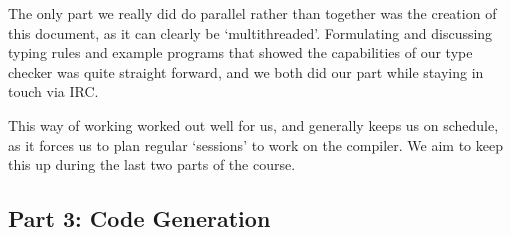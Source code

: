 \documentclass[a4paper]{article}
\begin{document}
The only part we really did do parallel rather than together was the creation of this document, as it can clearly be `multithreaded'. Formulating and discussing typing rules and example programs that showed the capabilities of our type checker was quite straight forward, and we both did our part while staying in touch via IRC.

This way of working worked out well for us, and generally keeps us on schedule, as it forces us to plan regular `sessions' to work on the compiler. We aim to keep this up during the last two parts of the course.

\subsection{Part 3: Code Generation}
\end{document}
